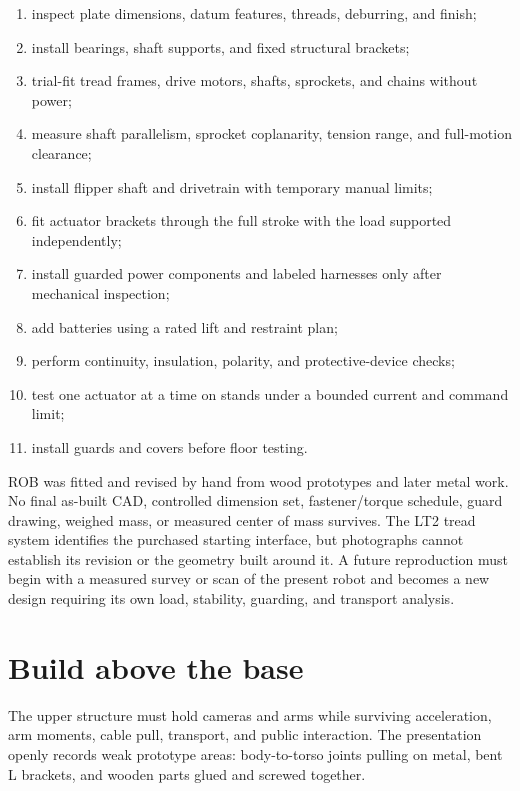 \documentclass[10pt,openany]{book}
\begin{document}
\begin{enumerate}
  \item inspect plate dimensions, datum features, threads, deburring, and finish;
  \item install bearings, shaft supports, and fixed structural brackets;
  \item trial-fit tread frames, drive motors, shafts, sprockets, and chains without power;
  \item measure shaft parallelism, sprocket coplanarity, tension range, and full-motion clearance;
  \item install flipper shaft and drivetrain with temporary manual limits;
  \item fit actuator brackets through the full stroke with the load supported independently;
  \item install guarded power components and labeled harnesses only after mechanical inspection;
  \item add batteries using a rated lift and restraint plan;
  \item perform continuity, insulation, polarity, and protective-device checks;
  \item test one actuator at a time on stands under a bounded current and command limit;
  \item install guards and covers before floor testing.
\end{enumerate}

\begin{fieldnotebox}[title={RECORD LIMIT: HAND-BUILT GEOMETRY}]
ROB was fitted and revised by hand from wood prototypes and later metal work. No final as-built CAD, controlled dimension set, fastener/torque schedule, guard drawing, weighed mass, or measured center of mass survives. The LT2 tread system identifies the purchased starting interface, but photographs cannot establish its revision or the geometry built around it. A future reproduction must begin with a measured survey or scan of the present robot and becomes a new design requiring its own load, stability, guarding, and transport analysis.
\end{fieldnotebox}


\chapter{Build above the base}

The upper structure must hold cameras and arms while surviving acceleration, arm moments, cable pull, transport, and public interaction. The presentation openly records weak prototype areas: body-to-torso joints pulling on metal, bent L brackets, and wooden parts glued and screwed together.
\end{document}

